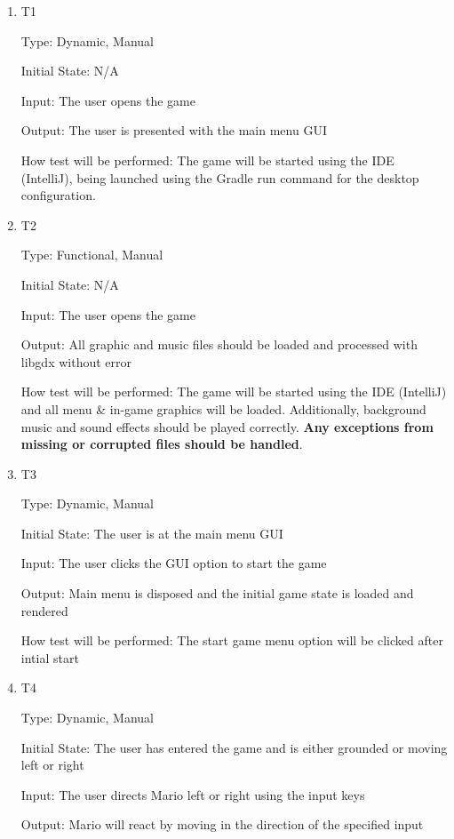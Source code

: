\documentclass[12pt, titlepage]{article}
\begin{document}
\begin{enumerate}

\item{T1\\}

Type: Dynamic, Manual

Initial State: N/A

Input: The user opens the game

Output: The user is presented with the main menu GUI

How test will be performed: The game will be started using the IDE (IntelliJ), being launched using the Gradle run command for the desktop configuration.

\item{T2\\}

Type: Functional, Manual

Initial State: N/A

Input: The user opens the game

Output: All graphic and music files should be loaded and processed with libgdx without error

How test will be performed: The game will be started using the IDE (IntelliJ) and all menu \& in-game graphics will be loaded. Additionally, background music and sound effects should be played correctly. \textbf{Any exceptions from missing or corrupted files should be handled}.

\item{T3\\}

Type: Dynamic, Manual

Initial State: The user is at the main menu GUI

Input: The user clicks the GUI option to start the game

Output: Main menu is disposed and the initial game state is loaded and rendered

How test will be performed: The start game menu option will be clicked after intial start

\item{T4\\}

Type: Dynamic, Manual

Initial State: The user has entered the game and is either grounded or moving left or right

Input: The user directs Mario left or right using the input keys

Output: Mario will react by moving in the direction of the specified input


\end{enumerate}
\end{document}
